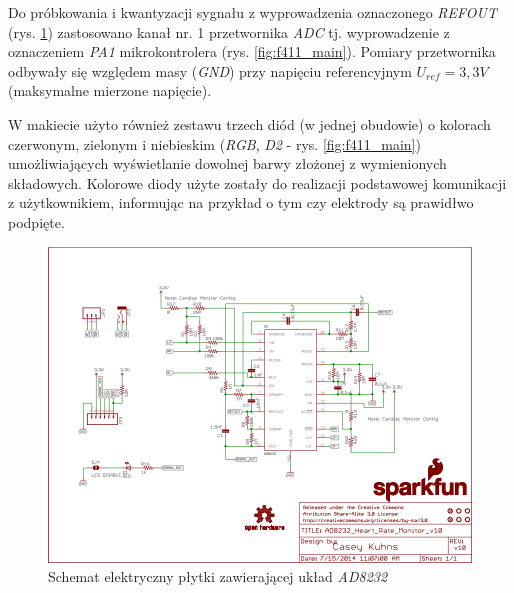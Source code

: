 Do próbkowania i kwantyzacji sygnału z wyprowadzenia oznaczonego \textit{REFOUT} (rys. \ref{fig:ad8232_sch})
zastosowano kanał nr. 1 przetwornika \textit{ADC} tj. wyprowadzenie z oznaczeniem \textit{PA1} mikrokontrolera 
(rys. \ref{fig:f411_main}). Pomiary przetwornika odbywały się względem masy (\textit{GND}) przy napięciu referencyjnym
$U_{ref} = 3,3V$ (maksymalne mierzone napięcie).

W makiecie użyto również zestawu trzech diód (w jednej obudowie) o kolorach czerwonym, zielonym i niebieskim 
(\textit{RGB}, \textit{D2} - rys. \ref{fig:f411_main}) umożliwiających wyświetlanie dowolnej barwy złożonej 
z wymienionych składowych. Kolorowe diody użyte zostały do realizacji podstawowej komunikacji z użytkownikiem,
informując na przykład o tym czy elektrody są prawidłwo podpięte.

\begin{figure}[h!]
    \centering 
    \includegraphics[scale=0.65]{pl/media/ad8232_sch.png}
    \caption{Schemat elektryczny płytki \cite{AD8232BS} zawierającej układ \textit{AD8232}}
    \label{fig:ad8232_sch}
\end{figure}

